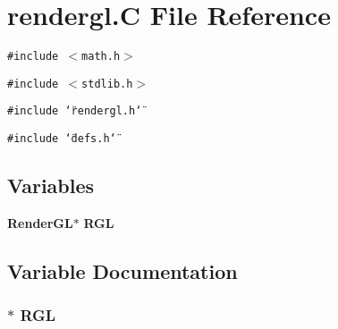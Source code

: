 \section{rendergl.C File Reference}
\label{rendergl_C}
{\tt \#include $<$math.h$>$}\par
{\tt \#include $<$stdlib.h$>$}\par
{\tt \#include \char`\"{}rendergl.h\char`\"{}}\par
{\tt \#include \char`\"{}defs.h\char`\"{}}\par
\subsection*{Variables}
\begin{CompactItemize}
\item 
{\bf Render\-GL}$\ast$ {\bf RGL}
\end{CompactItemize}


\subsection{Variable Documentation}
\subsubsection{$\ast$ RGL}\label{rendergl_C_a0}


